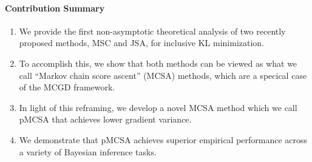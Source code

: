 \vspace{-0.1in}
\paragraph{Contribution Summary}
\setlength\itemsep{0.01in}
\begin{enumerate}
    \item We provide the first non-asymptotic theoretical analysis of two recently proposed methods, MSC and JSA, for inclusive KL minimization.
    \item To accomplish this, we show that both methods can be viewed as what we call ``Markov chain score ascent'' (MCSA) methods, which are a specical case of the MCGD framework. 
    \item In light of this reframing, we develop a novel MCSA method which we call pMCSA that achieves lower gradient variance.
    \item We demonstrate that pMCSA achieves superior empirical performance across a variety of Bayesian inference tasks.
\end{enumerate}

